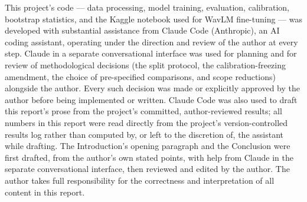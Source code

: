 \documentclass[10pt]{article}
\begin{document}
This project's code --- data processing, model training, evaluation, calibration, bootstrap statistics,
and the Kaggle notebook used for WavLM fine-tuning --- was developed with substantial assistance from
Claude Code (Anthropic), an AI coding assistant, operating under the direction and review of the author
at every step. Claude in a separate conversational interface was used for planning and for review of
methodological decisions (the split protocol, the calibration-freezing amendment, the choice of
pre-specified comparisons, and scope reductions) alongside the author. Every such decision was made or
explicitly approved by the author before being implemented or written. Claude Code was also used to draft
this report's prose from the project's committed, author-reviewed results; all numbers in this report
were read directly from the project's version-controlled results log rather than computed by, or left to
the discretion of, the assistant while drafting. The Introduction's opening paragraph and the
Conclusion were first drafted, from the author's own stated points, with help from Claude in the
separate conversational interface, then reviewed and edited by the author. The author takes full
responsibility for the correctness and interpretation of all content in this report.



\end{document}
